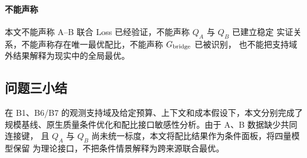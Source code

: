 \paragraph{不能声称}
本文不能声称 A--B 联合 Loss 已经验证，不能声称 $Q_A$ 与 $Q_B$ 已建立稳定
实证关系，不能声称存在唯一最优配比，不能声称 $G_{\rm bridge}$ 已被识别，
也不能把支持域外结果解释为现实中的全局最优。

\subsection{问题三小结}
\label{sec:q3-summary}

在 B1、B6/B7 的观测支持域及给定预算、上下文和成本假设下，本文分别完成了
规模基线、原生质量条件优化和配比接口敏感性分析。由于 A、B 数据缺少共同连接键，
且 $Q_A$ 与 $Q_B$ 尚未统一标度，本文将配比结果作为条件面板，将四量模型保留
为理论接口，不把条件情景解释为跨来源联合最优。
